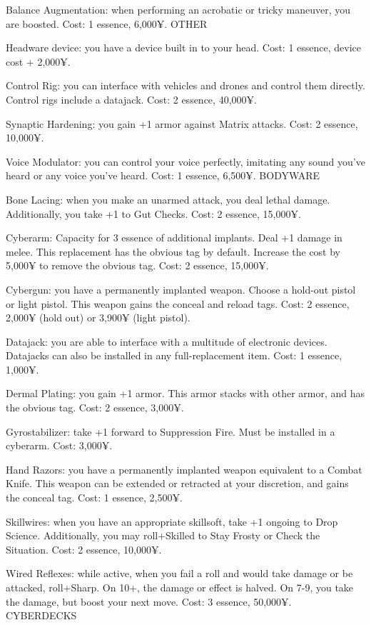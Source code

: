 Balance Augmentation: when performing an acrobatic or tricky maneuver, you are boosted. Cost: 1 essence, 6,000¥.
OTHER

Headware device: you have a device built in to your head. Cost: 1 essence, device cost + 2,000¥.

Control Rig: you can interface with vehicles and drones and control them directly. Control rigs include a datajack. Cost: 2 essence, 40,000¥.

Synaptic Hardening: you gain +1 armor against Matrix attacks. Cost: 2 essence, 10,000¥.

Voice Modulator: you can control your voice perfectly, imitating any sound you’ve heard or any voice you’ve heard. Cost: 1 essence, 6,500¥.
BODYWARE

Bone Lacing: when you make an unarmed attack, you deal lethal damage. Additionally, you take +1 to Gut Checks. Cost: 2 essence, 15,000¥.

Cyberarm: Capacity for 3 essence of additional implants. Deal +1 damage in melee. This replacement has the obvious tag by default. Increase the cost by 5,000¥ to remove the obvious tag. Cost: 2 essence, 15,000¥.

Cybergun: you have a permanently implanted weapon. Choose a hold-out pistol or light pistol. This weapon gains the conceal and reload tags. Cost: 2 essence, 2,000¥ (hold out) or 3,900¥ (light pistol).

Datajack: you are able to interface with a multitude of electronic devices. Datajacks can also be installed in any full-replacement item. Cost: 1 essence, 1,000¥.

Dermal Plating: you gain +1 armor. This armor stacks with other armor, and has the obvious tag. Cost: 2 essence, 3,000¥.

Gyrostabilizer: take +1 forward to Suppression Fire. Must be installed in a cyberarm. Cost: 3,000¥.

Hand Razors: you have a permanently implanted weapon equivalent to a Combat Knife. This weapon can be extended or retracted at your discretion, and gains the conceal tag. Cost: 1 essence, 2,500¥.

Skillwires: when you have an appropriate skillsoft, take +1 ongoing to Drop Science. Additionally, you may roll+Skilled to Stay Frosty or Check the Situation. Cost: 2 essence, 10,000¥.

Wired Reflexes: while active, when you fail a roll and would take damage or be attacked, roll+Sharp. On 10+, the damage or effect is halved. On 7-9, you take the damage, but boost your next move. Cost: 3 essence, 50,000¥.
CYBERDECKS

